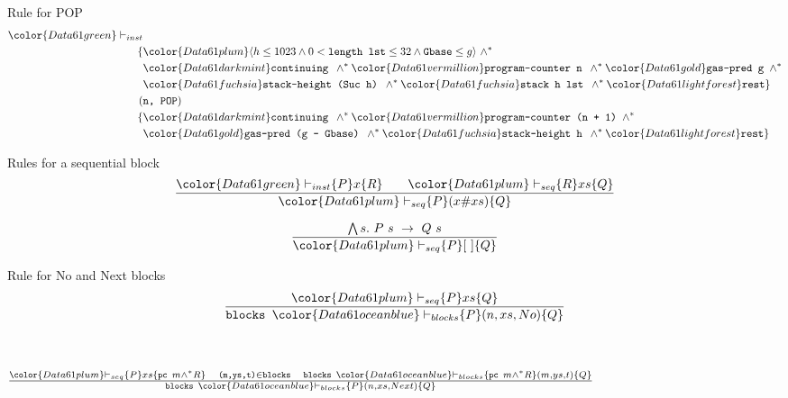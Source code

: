 \documentclass{beamer}
\begin{document}
\setbeamercovered{}
\begin{frame}{Rule for POP}
	\begin{align*}
		{\color{Data61 green}\vdash_{inst}}&\\
		\{&{\color{Data61 plum}\langle h \leq 1023 \wedge 0 < \texttt{length lst} \leq 32 \wedge \texttt{Gbase} \leq g \rangle}~ \wedge^*\\
		&{\color{Data61 dark mint}\texttt{continuing }} \wedge^*
		{\color{Data61 vermillion}\texttt{program-counter n }} \wedge^*
		{\color{Data61 gold}\texttt{gas-pred g }} \wedge^*\\
		&{\color{Data61 fuchsia}\texttt{stack-height (Suc h) }} \wedge^*
		{\color{Data61 fuchsia}\texttt{stack h lst }} \wedge^*
		{\color{Data61 light forest}\texttt{rest}}
		\}\\
		(&\texttt{n, POP}) \\
		\{&{\color{Data61 dark mint}\texttt{continuing }} \wedge^*
		{\color{Data61 vermillion}\texttt{program-counter (n + 1) }} \wedge^*\\
		&{\color{Data61 gold}\texttt{gas-pred (g - Gbase) }} \wedge^*
		{\color{Data61 fuchsia}\texttt{stack-height h }} \wedge^*
		{\color{Data61 light forest}\texttt{rest}}\}
	\end{align*}
\end{frame}

\begin{frame}{Rules for a sequential block}
	\[\frac{{\color{Data61 green}\vdash_{inst}} \{P\} x \{R\}
		\qquad {\color{Data61 plum}\vdash_{seq}} \{R\} xs \{Q\}}
	{{\color{Data61 plum}\vdash_{seq}} \{P\} (x\#xs) \{Q\}}\]

	\[\frac{\bigwedge s.~P~s~\rightarrow~Q~s}
	{{\color{Data61 plum}\vdash_{seq}} \{P\} [~] \{Q\}}\]
\end{frame}

\begin{frame}{Rule for No and Next blocks}
	\[\frac{{\color{Data61 plum}\vdash_{seq}} \{P\} xs \{Q\}}
	{\texttt{blocks~}{\color{Data61 ocean blue}\vdash_{blocks}} \{P\} (n,xs,No) \{Q\}}\]

	~\\~\\
	\centering
	$\frac{{\color{Data61 plum}\vdash_{seq}} \{P\} xs \{\texttt{pc } m \wedge^* R\}
		\quad \texttt{(m,ys,t)}\in \texttt{blocks}
		\quad \texttt{blocks~}{\color{Data61 ocean blue}\vdash_{blocks}} \{\texttt{pc } m \wedge^* R\} (m,ys,t) \{Q\}}
	{\texttt{blocks~}{\color{Data61 ocean blue}\vdash_{blocks}} \{P\} (n,xs,Next) \{Q\}}$
\end{frame}
\end{document}
